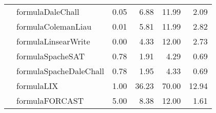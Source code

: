 \begin{tabular}{|l|l|r|r|r|r|}
 & formulaDaleChall & 0.05 & 6.88 & 11.99 & 2.09 \\ \cline{2-6}
 & formulaColemanLiau & 0.01 & 5.81 & 11.99 & 2.82 \\ \cline{2-6}
 & formulaLinsearWrite & 0.00 & 4.33 & 12.00 & 2.73 \\ \cline{2-6}
 & formulaSpacheSAT & 0.78 & 1.91 & 4.29 & 0.69 \\ \cline{2-6}
 & formulaSpacheDaleChall & 0.78 & 1.95 & 4.33 & 0.69 \\ \cline{2-6}
 & formulaLIX & 1.00 & 36.23 & 70.00 & 12.94 \\ \cline{2-6}
 & formulaFORCAST & 5.00 & 8.38 & 12.00 & 1.61 \\ \hline
\end{tabular}